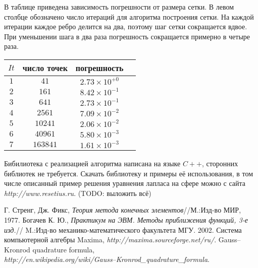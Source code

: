 \documentclass[a4paper]{article}
\begin{document}
В таблице приведена зависимость погрешности от размера сетки. В левом
столбце обозначено число итераций для алгоритма построения сетки. На
каждой итерации каждое ребро делится на два, поэтому шаг сетки
сокращается вдвое. При уменьшении шага в два раза погрешность
сокращается примерно в четыре раза.
\begin{center}
\begin{tabular}{| c | c | c | c |}
\hline
$It$ & число точек & погрешность \\
\hline
$1$ & $41$     & $2.73\times10^{+0}$ \\
$2$ & $161$    & $8.42\times10^{-1}$ \\
$3$ & $641$    & $2.73\times10^{-1}$ \\
$4$ & $2561$   & $7.09\times10^{-2}$ \\
$5$ & $10241$  & $2.06\times10^{-2}$ \\
$6$ & $40961$  & $5.80\times10^{-3}$ \\
$7$ & $163841$ & $1.61\times10^{-3}$ \\
\hline
\end{tabular}
\end{center}

Бибилиотека с реализацией алгоритма написана на языке $C++$,
сторонних библиотек не требуется. Скачать библиотеку и примеры её
использования, в том числе описанный пример решения уравнения лапласа на сфере можно с
сайта {\it http://www.resetius.ru}. (TODO: выложить всё)

\begin{thebibliography}{999}
 Г. Стренг, Дж. Фикс, {\it  Теория метода конечных
  элементов}//М.:Изд-во МИР, 1977.
 Богачев К. Ю., {\it  Практикум на ЭВМ.  Методы
    приближения функций, 3-е изд.}// M.:Изд-во
  механико-математического факультета МГУ. 2002.
 Система компьютерной алгебры Maxima, {\it http://maxima.sourceforge.net/ru/}.
Gauss–Kronrod quadrature formula, \\ {\it
  http://en.wikipedia.org/wiki/Gauss–Kronrod\_quadrature\_formula}. 
\end{thebibliography}
\end{document}
